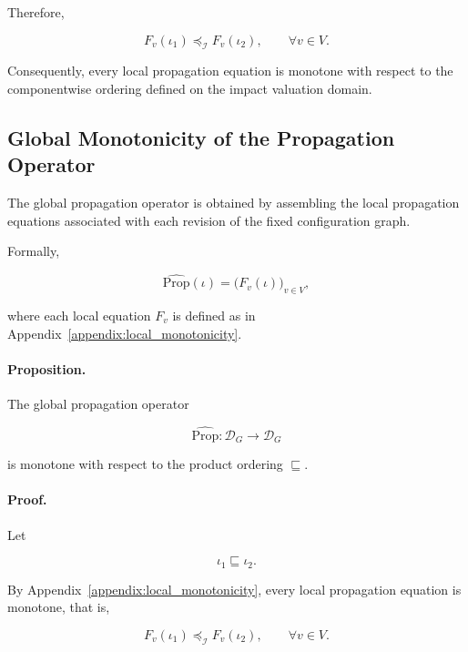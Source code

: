 \documentclass[10pt]{article}
\begin{document}
	Therefore,
	
	\begin{equation}
		\label{eq:local_monotone}
		F_v(\iota_1)
		\preceq_{\mathcal I}
		F_v(\iota_2),
		\qquad
		\forall v\in V.
	\end{equation}
	
	Consequently, every local propagation equation is monotone with respect to the
	componentwise ordering defined on the impact valuation domain.
	
	\subsection{Global Monotonicity of the Propagation Operator}
	\label{appendix:global_monotonicity}
	The global propagation operator is obtained by assembling the local propagation
	equations associated with each revision of the fixed configuration graph.
	
	Formally,
	
	\begin{equation}
		\label{eq:global_operator}
		\widehat{\mathrm{Prop}}(\iota)
		=
		\bigl(
		F_v(\iota)
		\bigr)_{v\in V},
	\end{equation}
	
	where each local equation $F_v$ is defined as in
	Appendix~\ref{appendix:local_monotonicity}.
	
	\paragraph{Proposition.}
	The global propagation operator
	
	\[
	\widehat{\mathrm{Prop}}
	:
	\mathcal D_G
	\rightarrow
	\mathcal D_G
	\]
	
	is monotone with respect to the product ordering
	$\sqsubseteq$.
	
	\paragraph{Proof.}
	
	Let
	
	\[
	\iota_1
	\sqsubseteq
	\iota_2.
	\]
	
	By Appendix~\ref{appendix:local_monotonicity}, every local propagation equation
	is monotone, that is,
	
	\[
	F_v(\iota_1)
	\preceq_{\mathcal I}
	F_v(\iota_2),
	\qquad
	\forall v\in V.
	\]
	
\end{document}

